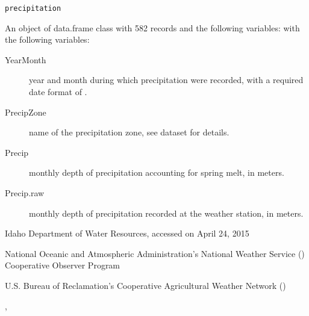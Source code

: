 \documentclass[a4paper]{book}
\begin{document}
%
\begin{Usage}
\begin{verbatim}
precipitation
\end{verbatim}
\end{Usage}
%
\begin{Format}
An object of data.frame class with 582 records and the following variables:
with the following variables:
\begin{description}

\item[YearMonth] year and month during which precipitation were recorded,
with a required date format of .
\item[PrecipZone] name of the precipitation zone,
see  dataset for details.
\item[Precip] monthly depth of precipitation accounting for spring melt, in meters.
\item[Precip.raw] monthly depth of precipitation recorded at the weather station,
in meters.

\end{description}
\end{Format}
%
\begin{Source}\relax
Idaho Department of Water Resources, accessed on April 24, 2015
\end{Source}
%
\begin{References}\relax
National Oceanic and Atmospheric Administration's National Weather Service
() Cooperative Observer Program

U.S. Bureau of Reclamation's Cooperative Agricultural Weather Network
()
\end{References}
%
\begin{SeeAlso}\relax
{}, 
\end{SeeAlso}
%
\begin{Examples}
\end{Examples}
\end{document}

